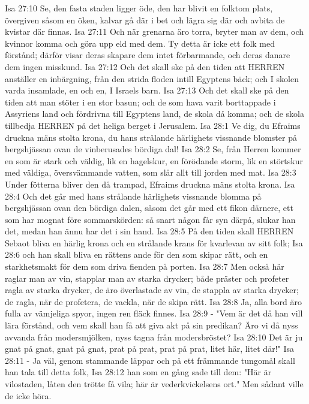 Isa 27:10  Se, den fasta staden ligger öde, den har blivit en folktom plats, övergiven såsom en öken, kalvar gå där i bet och lägra sig där och avbita de kvistar där finnas.
Isa 27:11  Och när grenarna äro torra, bryter man av dem, och kvinnor komma och göra upp eld med dem. Ty detta är icke ett folk med förstånd; därför visar deras skapare dem intet förbarmande, och deras danare dem ingen misskund.
Isa 27:12  Och det skall ske på den tiden att HERREN anställer en inbärgning, från den strida floden intill Egyptens bäck; och I skolen varda insamlade, en och en, I Israels barn.
Isa 27:13  Och det skall ske på den tiden att man stöter i en stor basun; och de som hava varit borttappade i Assyriens land och fördrivna till Egyptens land, de skola då komma; och de skola tillbedja HERREN på det heliga berget i Jerusalem.
Isa 28:1  Ve dig, du Efraims druckna mäns stolta krona, du hans strålande härlighets vissnande blomster på bergshjässan ovan de vinberusades bördiga dal!
Isa 28:2  Se, från Herren kommer en som är stark och väldig, lik en hagelskur, en förödande storm, lik en störtskur med väldiga, översvämmande vatten, som slår allt till jorden med mat.
Isa 28:3  Under fötterna bliver den då trampad, Efraims druckna mäns stolta krona.
Isa 28:4  Och det går med hans strålande härlighets vissnande blomma på bergshjässan ovan den bördiga dalen, såsom det går med ett fikon därnere, ett som har mognat före sommarskörden: så snart någon får syn därpå, slukar han det, medan han ännu har det i sin hand.
Isa 28:5  På den tiden skall HERREN Sebaot bliva en härlig krona och en strålande krans för kvarlevan av sitt folk;
Isa 28:6  och han skall bliva en rättens ande för den som skipar rätt, och en starkhetsmakt för dem som driva fienden på porten.
Isa 28:7  Men också här raglar man av vin, stapplar man av starka drycker; både präster och profeter ragla av starka drycker, de äro överlastade av vin, de stappla av starka drycker; de ragla, när de profetera, de vackla, när de skipa rätt.
Isa 28:8  Ja, alla bord äro fulla av vämjeliga spyor, ingen ren fläck finnes.
Isa 28:9  - "Vem är det då han vill lära förstånd, och vem skall han få att giva akt på sin predikan? Äro vi då nyss avvanda från modersmjölken, nyss tagna från modersbröstet?
Isa 28:10  Det är ju gnat på gnat, gnat på gnat, prat på prat, prat på prat, litet här, litet där!"
Isa 28:11  - Ja väl, genom stammande läppar och på ett främmande tungomål skall han tala till detta folk,
Isa 28:12  han som en gång sade till dem: "Här är vilostaden, låten den trötte få vila; här är vederkvickelsens ort." Men sådant ville de icke höra.
